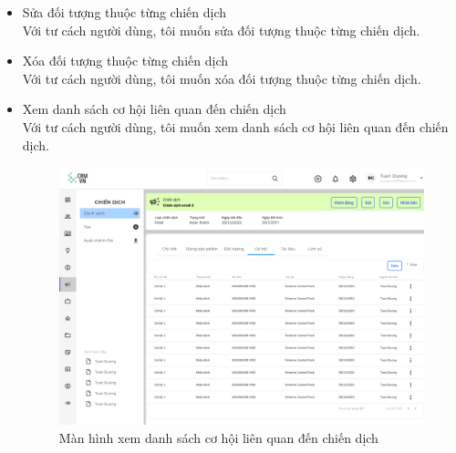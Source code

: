 \documentclass[12pt,a4paper]{article}
\begin{document}
\begin{enumerate}
\begin{itemize}
            \item Sửa đối tượng thuộc từng chiến dịch\\
            Với tư cách người dùng, tôi muốn sửa đối tượng thuộc từng chiến dịch.

            \item Xóa đối tượng thuộc từng chiến dịch \\
            Với tư cách người dùng, tôi muốn xóa đối tượng thuộc từng chiến dịch.


            \item Xem danh sách cơ hội liên quan đến chiến dịch \\
            Với tư cách người dùng, tôi muốn xem danh sách cơ hội liên quan đến chiến dịch.

            \begin{figure}[H]
                \centering \includegraphics[width=\textwidth]{Img/Nguyet/Chiendich/dscohoi.png}
                \vspace{0.5cm}
                \caption{Màn hình xem danh sách cơ hội liên quan đến chiến dịch }
                \label{cohoichiendich}
            \end{figure}


\end{itemize}
\end{enumerate}
\end{document}
